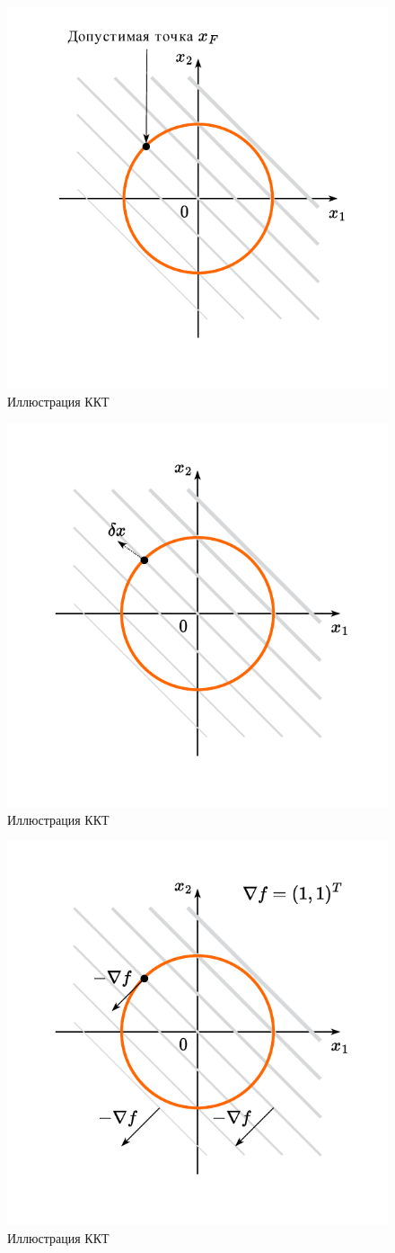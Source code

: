\documentclass[
  russian,
  letterpaper,
  DIV=11,
  numbers=noendperiod]{scrartcl}
\begin{document}
\begin{figure}[H]

{\centering \includegraphics[width=0.5\linewidth,height=\textheight,keepaspectratio]{graphon-eq_constraint_3_ru.pdf}

}

\caption{Иллюстрация ККТ}

\end{figure}%

\begin{figure}[H]

{\centering \includegraphics[width=0.5\linewidth,height=\textheight,keepaspectratio]{eq_constr_4.pdf}

}

\caption{Иллюстрация ККТ}

\end{figure}%

\begin{figure}[H]

{\centering \includegraphics[width=0.5\linewidth,height=\textheight,keepaspectratio]{eq_constr_5.pdf}

}

\caption{Иллюстрация ККТ}

\end{figure}%
\end{document}

